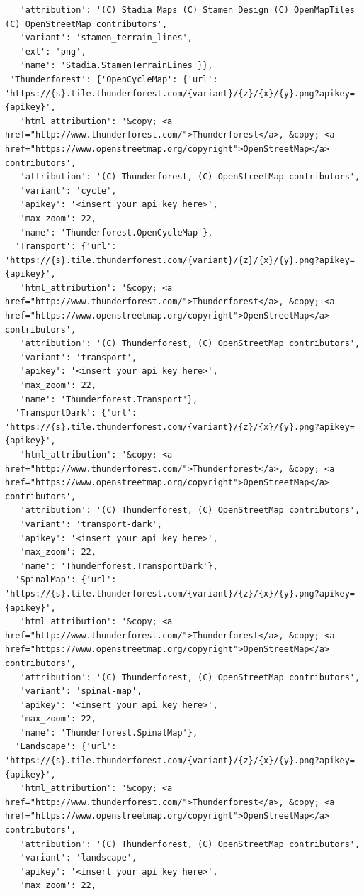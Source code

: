 \documentclass[
  letterpaper,
  DIV=11,
  numbers=noendperiod]{scrreprt}
\begin{document}
\begin{verbatim}
   'attribution': '(C) Stadia Maps (C) Stamen Design (C) OpenMapTiles (C) OpenStreetMap contributors',
   'variant': 'stamen_terrain_lines',
   'ext': 'png',
   'name': 'Stadia.StamenTerrainLines'}},
 'Thunderforest': {'OpenCycleMap': {'url': 'https://{s}.tile.thunderforest.com/{variant}/{z}/{x}/{y}.png?apikey={apikey}',
   'html_attribution': '&copy; <a href="http://www.thunderforest.com/">Thunderforest</a>, &copy; <a href="https://www.openstreetmap.org/copyright">OpenStreetMap</a> contributors',
   'attribution': '(C) Thunderforest, (C) OpenStreetMap contributors',
   'variant': 'cycle',
   'apikey': '<insert your api key here>',
   'max_zoom': 22,
   'name': 'Thunderforest.OpenCycleMap'},
  'Transport': {'url': 'https://{s}.tile.thunderforest.com/{variant}/{z}/{x}/{y}.png?apikey={apikey}',
   'html_attribution': '&copy; <a href="http://www.thunderforest.com/">Thunderforest</a>, &copy; <a href="https://www.openstreetmap.org/copyright">OpenStreetMap</a> contributors',
   'attribution': '(C) Thunderforest, (C) OpenStreetMap contributors',
   'variant': 'transport',
   'apikey': '<insert your api key here>',
   'max_zoom': 22,
   'name': 'Thunderforest.Transport'},
  'TransportDark': {'url': 'https://{s}.tile.thunderforest.com/{variant}/{z}/{x}/{y}.png?apikey={apikey}',
   'html_attribution': '&copy; <a href="http://www.thunderforest.com/">Thunderforest</a>, &copy; <a href="https://www.openstreetmap.org/copyright">OpenStreetMap</a> contributors',
   'attribution': '(C) Thunderforest, (C) OpenStreetMap contributors',
   'variant': 'transport-dark',
   'apikey': '<insert your api key here>',
   'max_zoom': 22,
   'name': 'Thunderforest.TransportDark'},
  'SpinalMap': {'url': 'https://{s}.tile.thunderforest.com/{variant}/{z}/{x}/{y}.png?apikey={apikey}',
   'html_attribution': '&copy; <a href="http://www.thunderforest.com/">Thunderforest</a>, &copy; <a href="https://www.openstreetmap.org/copyright">OpenStreetMap</a> contributors',
   'attribution': '(C) Thunderforest, (C) OpenStreetMap contributors',
   'variant': 'spinal-map',
   'apikey': '<insert your api key here>',
   'max_zoom': 22,
   'name': 'Thunderforest.SpinalMap'},
  'Landscape': {'url': 'https://{s}.tile.thunderforest.com/{variant}/{z}/{x}/{y}.png?apikey={apikey}',
   'html_attribution': '&copy; <a href="http://www.thunderforest.com/">Thunderforest</a>, &copy; <a href="https://www.openstreetmap.org/copyright">OpenStreetMap</a> contributors',
   'attribution': '(C) Thunderforest, (C) OpenStreetMap contributors',
   'variant': 'landscape',
   'apikey': '<insert your api key here>',
   'max_zoom': 22,

\end{verbatim}
\end{document}
